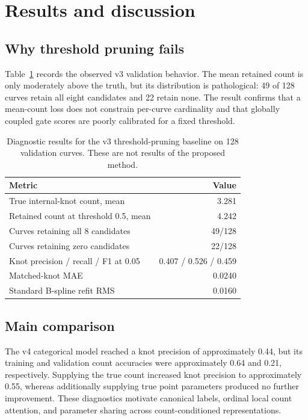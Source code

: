 \section{Results and discussion}
\label{sec:results}

\subsection{Why threshold pruning fails}

Table~\ref{tab:v3diagnostic} records the observed v3 validation behavior. The
mean retained count is only moderately above the truth, but its distribution is
pathological: 49 of 128 curves retain all eight candidates and 22 retain none.
The result confirms that a mean-count loss does not constrain per-curve
cardinality and that globally coupled gate scores are poorly calibrated for a
fixed threshold.

\begin{table}[t]
  \centering
  \caption{Diagnostic results for the v3 threshold-pruning baseline on 128
  validation curves. These are not results of the proposed method.}
  \label{tab:v3diagnostic}
  \begin{tabular}{lr}
    \toprule
    Metric & Value \\
    \midrule
    True internal-knot count, mean & 3.281 \\
    Retained count at threshold 0.5, mean & 4.242 \\
    Curves retaining all 8 candidates & 49/128 \\
    Curves retaining zero candidates & 22/128 \\
    Knot precision / recall / F1 at 0.05 & 0.407 / 0.526 / 0.459 \\
    Matched-knot MAE & 0.0240 \\
    Standard B-spline refit RMS & 0.0160 \\
    \bottomrule
  \end{tabular}
\end{table}

\subsection{Main comparison}

The v4 categorical model reached a knot precision of approximately 0.44, but
its training and validation count accuracies were approximately 0.64 and 0.21,
respectively. Supplying the true count increased knot precision to approximately
0.55, whereas additionally supplying true point parameters produced no further
improvement. These diagnostics motivate canonical labels, ordinal local count
attention, and parameter sharing across count-conditioned representations.

